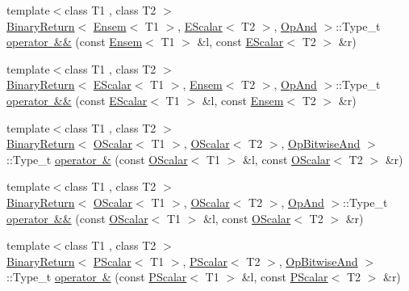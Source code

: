 \begin{DoxyCompactItemize}
\item 
{\footnotesize template$<$class T1 , class T2 $>$ }\\\mbox{\hyperlink{structENSEM_1_1BinaryReturn}{Binary\+Return}}$<$ \mbox{\hyperlink{classENSEM_1_1Ensem}{Ensem}}$<$ T1 $>$, \mbox{\hyperlink{classENSEM_1_1EScalar}{E\+Scalar}}$<$ T2 $>$, \mbox{\hyperlink{structENSEM_1_1OpAnd}{Op\+And}} $>$\+::Type\+\_\+t \mbox{\hyperlink{namespaceENSEM_ga00415a6169d18f80656be828f11a157b}{operator \&\&}} (const \mbox{\hyperlink{classENSEM_1_1Ensem}{Ensem}}$<$ T1 $>$ \&l, const \mbox{\hyperlink{classENSEM_1_1EScalar}{E\+Scalar}}$<$ T2 $>$ \&r)
\item 
{\footnotesize template$<$class T1 , class T2 $>$ }\\\mbox{\hyperlink{structENSEM_1_1BinaryReturn}{Binary\+Return}}$<$ \mbox{\hyperlink{classENSEM_1_1EScalar}{E\+Scalar}}$<$ T1 $>$, \mbox{\hyperlink{classENSEM_1_1Ensem}{Ensem}}$<$ T2 $>$, \mbox{\hyperlink{structENSEM_1_1OpAnd}{Op\+And}} $>$\+::Type\+\_\+t \mbox{\hyperlink{namespaceENSEM_ga327bfc24e647dfce0a0b0373f4e72084}{operator \&\&}} (const \mbox{\hyperlink{classENSEM_1_1EScalar}{E\+Scalar}}$<$ T1 $>$ \&l, const \mbox{\hyperlink{classENSEM_1_1Ensem}{Ensem}}$<$ T2 $>$ \&r)
\item 
{\footnotesize template$<$class T1 , class T2 $>$ }\\\mbox{\hyperlink{structENSEM_1_1BinaryReturn}{Binary\+Return}}$<$ \mbox{\hyperlink{classENSEM_1_1OScalar}{O\+Scalar}}$<$ T1 $>$, \mbox{\hyperlink{classENSEM_1_1OScalar}{O\+Scalar}}$<$ T2 $>$, \mbox{\hyperlink{structENSEM_1_1OpBitwiseAnd}{Op\+Bitwise\+And}} $>$\+::Type\+\_\+t \mbox{\hyperlink{namespaceENSEM_ga0ce8b28e6efb00e905152096020cfafe}{operator \&}} (const \mbox{\hyperlink{classENSEM_1_1OScalar}{O\+Scalar}}$<$ T1 $>$ \&l, const \mbox{\hyperlink{classENSEM_1_1OScalar}{O\+Scalar}}$<$ T2 $>$ \&r)
\item 
{\footnotesize template$<$class T1 , class T2 $>$ }\\\mbox{\hyperlink{structENSEM_1_1BinaryReturn}{Binary\+Return}}$<$ \mbox{\hyperlink{classENSEM_1_1OScalar}{O\+Scalar}}$<$ T1 $>$, \mbox{\hyperlink{classENSEM_1_1OScalar}{O\+Scalar}}$<$ T2 $>$, \mbox{\hyperlink{structENSEM_1_1OpAnd}{Op\+And}} $>$\+::Type\+\_\+t \mbox{\hyperlink{namespaceENSEM_ga7e3b0e4d68793d07ed6616df54117609}{operator \&\&}} (const \mbox{\hyperlink{classENSEM_1_1OScalar}{O\+Scalar}}$<$ T1 $>$ \&l, const \mbox{\hyperlink{classENSEM_1_1OScalar}{O\+Scalar}}$<$ T2 $>$ \&r)
\item 
{\footnotesize template$<$class T1 , class T2 $>$ }\\\mbox{\hyperlink{structENSEM_1_1BinaryReturn}{Binary\+Return}}$<$ \mbox{\hyperlink{classENSEM_1_1PScalar}{P\+Scalar}}$<$ T1 $>$, \mbox{\hyperlink{classENSEM_1_1PScalar}{P\+Scalar}}$<$ T2 $>$, \mbox{\hyperlink{structENSEM_1_1OpBitwiseAnd}{Op\+Bitwise\+And}} $>$\+::Type\+\_\+t \mbox{\hyperlink{namespaceENSEM_gadbbb42ee94a77c2df59c5a4cf78fddeb}{operator \&}} (const \mbox{\hyperlink{classENSEM_1_1PScalar}{P\+Scalar}}$<$ T1 $>$ \&l, const \mbox{\hyperlink{classENSEM_1_1PScalar}{P\+Scalar}}$<$ T2 $>$ \&r)

\end{DoxyCompactItemize}
